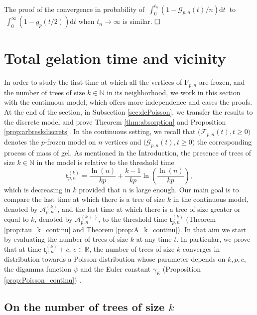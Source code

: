 \documentclass[a4, 11pt]{article}
\numberwithin{equation}{section}
\theoremstyle{plain}
\theoremstyle{definition}
\theoremstyle{remark}
\begin{document}
The proof of the convergence in probability of $~\int_0^{t_n} \left(1-\mathcal G_{p,n}(t)/n \right) \mathrm dt~$  to $~\int_0^{\infty} \left(1-g_p(t/2)\right) \mathrm dt$ when $t_n \rightarrow \infty$ is similar.
$\hfill \square$


\section{Total gelation time and vicinity}
\label{sec:gelation}

In order to study the first time at which all the vertices of $\mathrm F_{p,n}$ are frozen, and the number of trees of size $k \in \mathbb N$ in its neighborhood,  we work in this section with the continuous model, which offers more independence and eases the proofs. At the end of the section, in Subsection \ref{sec:dePoisson}, we transfer the results to the discrete model and prove Theorem \ref{thm:absorption} and Proposition \ref{prop:arbreskdiscrets}. In the continuous setting, we recall that $\big(\mathcal F_{p,n}(t),t\geq 0\big)$ denotes the $p$-frozen model on $n$ vertices and $\big(\mathcal G_{p,n}(t),t\geq 0\big)$ the corresponding process of mass of gel. As mentioned in the Introduction, the presence of trees of size $k \in \mathbb N$ in the model is relative to the threshold time
$$
\mathsf t^{(k)}_{p,n}=\frac{\ln(n)}{kp}+\frac{k-1}{kp}\ln \left(\frac{\ln(n)}{kp} \right),
$$
which is decreasing in $k$ provided that $n$ is large enough. 
Our main goal is to compare the last time at which there is a tree of size $k$ in the continuous model, denoted by $\mathcal A_{p,n}^{(k)}$, and the last time at which there is a tree of size greater or equal to $k$, denoted by $\mathcal A_{p,n}^{(k+)}$, to the threshold time $\mathsf t^{(k)}_{p,n}$ (Theorem \ref{prop:tau_k_continu} and Theorem \ref{prop:A_k_continu}). In that aim we start by evaluating the number of trees of size $k$ at any time $t$. In particular, we prove that at time  $\mathsf t^{(k)}_{p,n}+c$, $c \in \mathbb R$, the number of trees of size $k$ converges in distribution towards a Poisson distribution whose parameter depends on $k,p,c$, the digamma function $\psi$ and the Euler constant $\gamma_E$ (Proposition \ref{prop:Poisson_continu}) .

\subsection{On the number of trees of size $k$}
\end{document}
